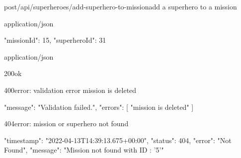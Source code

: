 \begin{apiRoute}{post}{/api/superheroes/add-superhero-to-mission}{add a superhero to a mission}
	\begin{routeParameter}
	\end{routeParameter}
	\begin{routeRequest}{application/json}
		\begin{routeRequestBody}
{
  "missionId": 15,
  "superheroId": 31
}
		\end{routeRequestBody}
	\end{routeRequest}
	\begin{routeResponse}{application/json}
		\begin{routeResponseItem}{200}{ok}
		\end{routeResponseItem}
	\begin{routeResponseItem}{400}{error: validation error mission is deleted}
	\begin{routeResponseItemBody}
	{
	"message": "Validation failed.",
	"errors": [
		"mission is deleted"
	]
   }
   \end{routeResponseItemBody}
	\end{routeResponseItem}
	
	\begin{routeResponseItem}{404}{error: mission or superhero not found}
			\begin{routeResponseItemBody}
{
	"timestamp": "2022-04-13T14:39:13.675+00:00",
	"status": 404,
	"error": "Not Found",
	"message": "Mission not found with ID : '5'"
}
			\end{routeResponseItemBody}
		\end{routeResponseItem}
	\end{routeResponse}
\end{apiRoute}